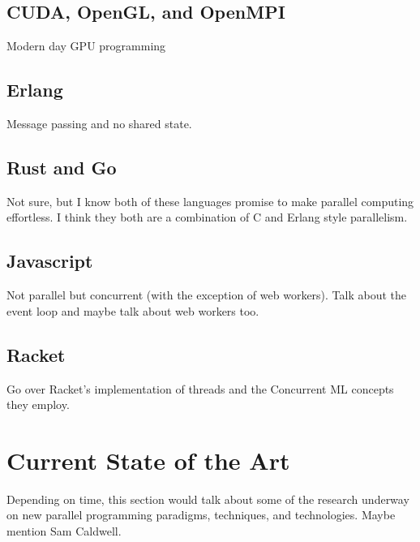 \documentclass{article}
\begin{document}
\subsection{CUDA, OpenGL, and OpenMPI}
Modern day GPU programming

\subsection{Erlang}
Message passing and no shared state.

\subsection{Rust and Go}
Not sure, but I know both of these languages promise to make parallel computing
effortless. I think they both are a combination of C and Erlang style parallelism.

\subsection{Javascript}
Not parallel but concurrent (with the exception of web workers). Talk about
the event loop and maybe talk about web workers too.

\subsection{Racket}
Go over Racket's implementation of threads and the Concurrent ML concepts they employ.

\section{Current State of the Art}
Depending on time, this section would talk about some of the research underway on
new parallel programming paradigms, techniques, and technologies. Maybe mention
Sam Caldwell.
\end{document}
